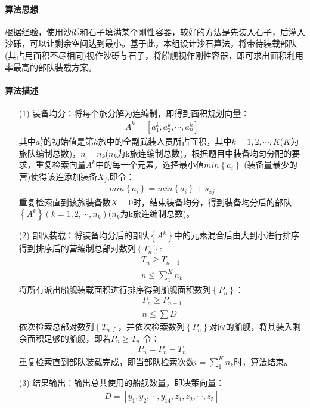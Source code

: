 \documentclass{whutmod}
\begin{document}
	 \paragraph{算法思想}
	 根据经验，使用沙砾和石子填满某个刚性容器，较好的方法是先装入石子，后灌入沙砾，可以让剩余空间达到最小。基于此，本组设计沙石算法，将带待装载部队(其占用面积不尽相同)视作沙砾与石子，将船舰视作刚性容器，即可求出面积利用率最高的部队装载方案。
	 \paragraph{算法描述}
	 	\begin{itemize}
	 	\item [(1)] 装备均分：将每个旅分解为连编制，即得到面积规划向量：
	 \begin{gather*}
	 	A^k=[a^k_{1},a^k_{2},\cdots,a^k_{n}]
	\end{gather*}
	 	其中$a^k_{i}$的初始值是第$k$旅中的全副武装人员所占面积，其中$k=1,2,\cdots,K$($K$为旅队编制总数)，$n=n_{k}$($n_{k}$为k旅连编制总数)。根据题目中装备均匀分配的要求，重复检索向量$A^k$中的每一个元素，选择最小值$min \left \{ a_{i} \right \}$ (装备量最少的营)使得该连添加装备$X_{j}$,即令：
	 	\begin{gather*}
	   min \left \{ a_{i} \right \}=min \left \{ a_{i} \right \}+s_{xj}
	 	\end{gather*}
	 	重复检索直到该旅装备数$X=0$时，结束装备均分，得到装备均分后的部队$ \left \{A^k\right \}(k=1,2,\cdots,n_{k})$($n_{k}$为k旅连编制总数)。
		\item [(2)] 部队装载：将装备均分后的部队$ \left \{A^k\right \}$中的元素混合后由大到小进行排序得到排序后的营编制总部对数列$ \left \{T_{n}\right \}$:
			\begin{gather*}
	T_{n}\geqslant 	T_{n+1}\\
	n\leq \sum_{1}^{K}n_{k}
		\end{gather*}
		将所有派出船舰装载面积进行排序得到船舰面积数列$ \left \{P_{n}\right \}$：
			\begin{gather*}
		P_{n}\geqslant 	P_{n+1}\\
		n\leq \sum D
		\end{gather*}
		依次检索总部对数列$ \left \{T_{n}\right \}$，并依次检索数列$ \left \{P_{n}\right \}$对应的船舰，将其装入剩余面积足够的船舰，即若$P_{n}\geqslant T_{n}$ 令：
		\begin{gather*}
		P_{n}=	P_{n}-	T_{n}
		\end{gather*}
		重复检索直到部队装载完成，即当部队检索次数$i=\sum_{1}^{K}n_{k}$时，算法结束。
		\item [(3)] 结果输出：输出总共使用的船舰数量，即决策向量：
			\begin{gather*}
		  D=[y_{1},y_{2},\cdots,y_{14},z_{1},z_{2},\cdots,z_{5}]
		  	\end{gather*}
		\end{itemize}	
\end{document}
